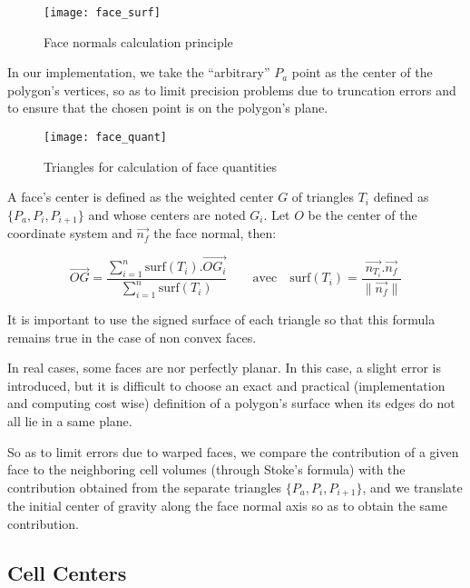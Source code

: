 \begin{figure}[!h]
\centerline{
\texttt{[image: face\_surf]}}
\caption{Face normals calculation principle}
\label{fig:algo.norm_fac.principle}
\end{figure}

In our implementation, we take the ``arbitrary'' $P_a$ point as
the center of the polygon's vertices, so as to limit
precision problems due to truncation errors and to ensure that
the chosen point is on the polygon's plane.

\begin{figure}[!h]
\centerline{
\texttt{[image: face\_quant]}}
\caption{Triangles for calculation of face quantities}
\label{fig:algo.grd_fac.triangles}
\end{figure}

A face's center is defined as the weighted center $G$ of triangles
$T_i$ defined as $\{P_a, P_i, P_{i+1}\}$ and whose centers are
noted $G_i$. Let $O$ be the center of the coordinate system and
$\overrightarrow{n_f}$ the face normal, then:

\begin{displaymath}
\overrightarrow{OG}
= \frac{\sum_{i=1}^n \textrm{surf}(T_i).\overrightarrow{OG_i}}
       {\sum_{i=1}^n \textrm{surf}(T_i)}
\qquad \textrm {avec} \quad
\textrm{surf}(T_i) = \frac{\overrightarrow{n_{T_i}}.\overrightarrow{n_f}}
                          {\parallel \overrightarrow{n_f} \parallel}
\end{displaymath}

It is important to use the signed surface of each triangle so
that this formula remains true in the case of non convex faces.

In real cases, some faces are nor perfectly planar. In this case,
a slight error is introduced, but it is difficult to choose an exact
and practical (implementation and computing cost wise) definition of a
polygon's surface when its edges do not all lie in a same plane.

So as to limit errors due to warped faces, we compare the contribution
of a given face to the neighboring cell volumes (through
Stoke's formula) with the contribution obtained from the separate
triangles $\{P_a, P_i, P_{i+1}\}$, and we translate the initial center
of gravity along the face normal axis so as to obtain the same contribution.

\subsection*{Cell Centers%
               \label{sec:geo_quant.cdgcel}}

